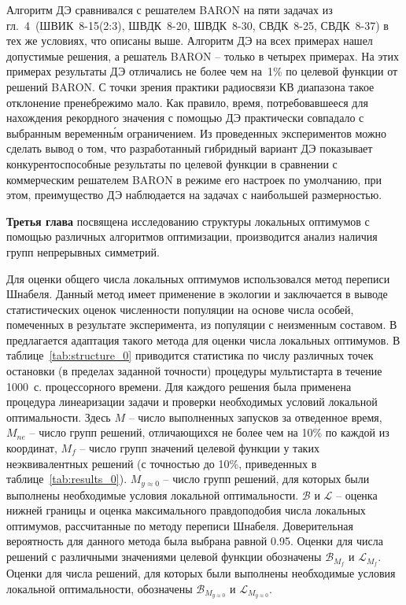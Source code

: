 Алгоритм ДЭ сравнивался с решателем BARON на пяти задачах из гл.~4~(ШВИК~8-15(2:3), ШВДК~8-20, ШВДК~8-30, СВДК~8-25, СВДК~8-37) в тех же условиях, что описаны выше. Алгоритм ДЭ на всех примерах нашел допустимые решения, а решатель BARON -- только в четырех примерах. На этих примерах результаты ДЭ отличались не более чем на~1\% по целевой функции от решений BARON. С точки зрения практики радиосвязи КВ диапазона такое отклонение пренебрежимо мало. Как правило, время, потребовавшееся для нахождения рекордного значения с помощью ДЭ практически совпадало с выбранным веременн\'{ы}м ограничением.  Из проведенных экспериментов можно сделать вывод о том, что разработанный гибридный вариант ДЭ показывает конкурентоспособные результаты по целевой функции в сравнении с коммерческим решателем BARON в режиме его настроек по умолчанию, при этом, преимущество ДЭ наблюдается на задачах с наибольшей размерностью.

{\textbf{Третья глава}} посвящена исследованию структуры локальных оптимумов с помощью различных алгоритмов оптимизации,
производится анализ наличия групп непрерывных симметрий.

Для оценки общего числа локальных оптимумов использовался метод переписи Шнабеля. Данный метод имеет применение в экологии и заключается в
выводе статистических оценок численности популяции на основе числа особей, помеченных в результате эксперимента, из популяции с неизменным
составом. В~ предлагается адаптация такого метода для оценки числа локальных оптимумов. В таблице~\ref{tab:structure_0} приводится статистика по числу различных точек остановки (в пределах заданной точности) процедуры мультистарта в течение 1000~с. процессорного времени. Для каждого решения была применена процедура линеаризации задачи и проверки необходимых условий локальной оптимальности. Здесь {$M$} -- число выполненных запусков за отведенное время, $M_{ne}$ -- число групп решений, отличающихся не более чем на 10\% по каждой из координат, {$M_{f}$} -- число групп значений целевой функции у таких неэквивалентных решений (с точностью до 10\%, приведенных в таблице~\ref{tab:results_0}). {$M_{y\approx0}$} -- число групп решений, для которых были выполнены необходимые условия локальной оптимальности. $\mathcal{B}$ и $\mathcal{L}$ -- оценка нижней границы и оценка максимального правдоподобия числа локальных оптимумов, рассчитанные по методу переписи Шнабеля. Доверительная вероятность для данного метода была выбрана равной 0.95. Оценки для числа решений с различными значениями целевой функции обозначены $\mathcal{B}_{M_f}$ и $\mathcal{L}_{M_f}$. Оценки для числа решений, для которых были выполнены необходимые условия локальной оптимальности, обозначены $\mathcal{B}_{M_{y\approx0}}$ и $\mathcal{L}_{M_{y\approx0}}$.


